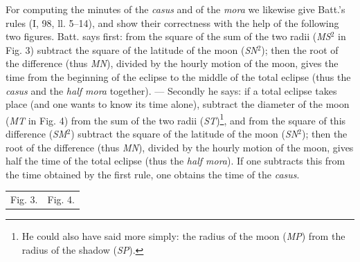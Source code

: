 \documentclass[11pt]{article}
\begin{document}
\par For computing the minutes of the \emph{casus} and of the \emph{mora} we likewise give Batt.'s rules (I, 98, ll. 5–14), and show their correctness with the help of the following two figures. Batt. says first: from the square of the sum of the two radii (\emph{MS}$^{2}$ in Fig. 3) subtract the square of the latitude of the moon (\emph{SN}$^{2}$); then the root of the difference (thus \emph{MN}), divided by the hourly motion of the moon, gives the time from the beginning of the eclipse to the middle of the total eclipse (thus the \emph{casus} and the \emph{half mora} together). — Secondly he says: if a total eclipse takes place (and one wants to know its time alone), subtract the diameter of the moon (\emph{MT} in Fig. 4) from the sum of the two radii (\emph{ST})\footnote{He could also have said more simply: the radius of the moon (\emph{MP}) from the radius of the shadow (\emph{SP}).}, and from the square of this difference (\emph{SM}$^{2}$) subtract the square of the latitude of the moon (\emph{SN}$^{2}$); then the root of the difference (thus \emph{MN}), divided by the hourly motion of the moon, gives half the time of the total eclipse (thus the \emph{half mora}). If one subtracts this from the time obtained by the first rule, one obtains the time of the \emph{casus}.\par
\begin{center}\small\begin{tabular}{cc}
Fig. 3.\footnotemarkT{} & Fig. 4. \\
\end{tabular}\end{center}
\addtocounter{footnoteT}{-1}
\end{document}
